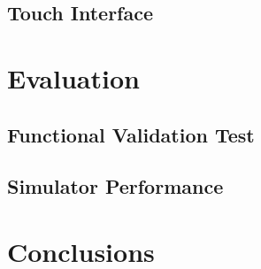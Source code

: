\documentclass[twoside]{uva-inf-bachelor-thesis}
\begin{document}
\section{Touch Interface}

\chapter{Evaluation}
\section{Functional Validation Test}
\section{Simulator Performance}

\chapter{Conclusions}

%
%
\printbibliography
\end{document}
